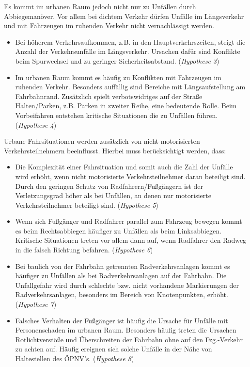 Es kommt im urbanen Raum jedoch nicht nur zu Unfällen durch Abbiegemanöver. Vor allem bei dichtem Verkehr dürfen Unfälle im Längsverkehr und mit Fahrzeugen im ruhenden Verkehr nicht vernachlässigt werden. 

\begin{itemize}	
	\item Bei höherem Verkehrsaufkommen, z.B. in den Hauptverkehrszeiten, steigt die Anzahl der Verkehrsunfälle im Längsverkehr. Ursachen dafür sind Konflikte beim Spurwechsel und zu geringer Sicherheitsabstand. (\textit{Hypothese 3})
	\item Im urbanen Raum kommt es häufig zu Konflikten mit Fahrzeugen im ruhenden Verkehr. Besonders auffällig sind Bereiche mit Längsaufstellung am Fahrbahnrand. Zusätzlich spielt verbotswidriges auf der Straße Halten/Parken, z.B. Parken in zweiter Reihe, eine bedeutende Rolle. Beim Vorbeifahren entstehen kritische Situationen die zu Unfällen führen. (\textit{Hypothese 4})
\end{itemize}

Urbane Fahrsituationen werden zusätzlich von nicht motorisierten Verkehrsteilnehmern beeinflusst. Hierbei muss berücksichtigt werden, dass:
	
\begin{itemize}
	\item Die Komplexität einer Fahrsituation und somit auch die Zahl der Unfälle wird erhöht, wenn nicht motorisierte Verkehrsteilnehmer daran beteiligt sind. Durch den geringen Schutz von Radfahrern/Fußgängern ist der Verletzungsgrad höher als bei Unfällen, an denen nur motorisierte Verkehrsteilnehmer beteiligt sind. (\textit{Hypothese 5})
	\item Wenn sich Fußgänger und Radfahrer parallel zum Fahrzeug bewegen kommt es beim Rechtsabbiegen häufiger zu Unfällen als beim Linksabbiegen. Kritische Situationen treten vor allem dann auf, wenn Radfahrer den Radweg in die falsch Richtung befahren. (\textit{Hypothese 6})
	\item Bei baulich von der Fahrbahn getrennten Radverkehrsanlagen kommt es häufiger zu Unfällen als bei Radverkehrsanlagen auf der Fahrbahn. Die Unfallgefahr wird durch schlechte bzw. nicht vorhandene Markierungen der Radverkehrsanlagen, besonders im Bereich von Knotenpunkten, erhöht. (\textit{Hypothese 7})
	\item Falsches Verhalten der Fußgänger ist häufig die Ursache für Unfälle mit Personenschaden im urbanen Raum. Besonders häufig treten die Ursachen Rotlichtverstöße und Überschreiten der Fahrbahn ohne auf den Fzg.-Verkehr zu achten auf. Häufig ereignen sich solche Unfälle in der Nähe von Haltestellen des ÖPNV's. (\textit{Hypothese 8})
\end{itemize}	

